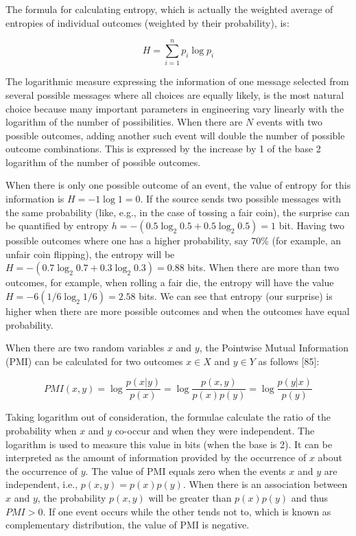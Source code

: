 \documentclass[11pt,openany,executivepaper]{book}
\begin{document}
The formula for calculating entropy, which is actually the weighted average of entropies of individual outcomes (weighted by their probability), is:

\begin{equation}
    H = \sum_{i=1}^{n} p_i \log p_i
\end{equation}

The logarithmic measure expressing the information of one message selected from several possible messages where all choices are equally likely, is the most natural choice because many important parameters in engineering vary linearly with the logarithm of the number of possibilities. When there are $N$ events with two possible outcomes, adding another such event will double the number of possible outcome combinations. This is expressed by the increase by 1 of the base 2 logarithm of the number of possible outcomes.

When there is only one possible outcome of an event, the value of entropy for this information is $H = -1 \log 1 = 0$. If the source sends two possible messages with the same probability (like, e.g., in the case of tossing a fair coin), the surprise can be quantified by entropy $h = -(0.5 \log_2 0.5 + 0.5 \log_2 0.5) = 1$ bit. Having two possible outcomes where one has a higher probability, say $70\%$ (for example, an unfair coin flipping), the entropy will be $H = -(0.7 \log_2 0.7 + 0.3 \log_2 0.3) = 0.88$ bits. When there are more than two outcomes, for example, when rolling a fair die, the entropy will have the value $H = -6(1/6 \log_2 1/6) = 2.58$ bits. We can see that entropy (our surprise) is higher when there are more possible outcomes and when the outcomes have equal probability.

When there are two random variables $x$ and $y$, the Pointwise Mutual Information (PMI) can be calculated for two outcomes $x \in X$ and $y \in Y$ as follows [85]:

\begin{equation}
    PMI(x,y) = \log \frac{p(x|y)}{p(x)} = \log \frac{p(x,y)}{p(x)p(y)} = \log \frac{p(y|x)}{p(y)}
\end{equation}

Taking logarithm out of consideration, the formulae calculate the ratio of the probability when $x$ and $y$ co-occur and when they were independent. The logarithm is used to measure this value in bits (when the base is 2). It can be interpreted as the amount of information provided by the occurrence of $x$ about the occurrence of $y$. The value of PMI equals zero when the events $x$ and $y$ are independent, i.e., $p(x,y) = p(x)p(y)$. When there is an association between $x$ and $y$, the probability $p(x,y)$ will be greater than $p(x)p(y)$ and thus $PMI > 0$. If one event occurs while the other tends not to, which is known as complementary distribution, the value of PMI is negative.
\end{document}
